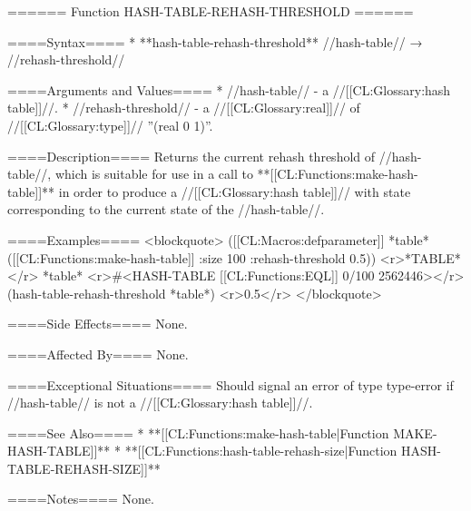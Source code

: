 ====== Function HASH-TABLE-REHASH-THRESHOLD ======

====Syntax====
  * **hash-table-rehash-threshold** //hash-table// → //rehash-threshold//

====Arguments and Values====
  * //hash-table// - a //[[CL:Glossary:hash table]]//.
  * //rehash-threshold// - a //[[CL:Glossary:real]]// of //[[CL:Glossary:type]]// ''(real 0 1)''.

====Description====
Returns the current rehash threshold of //hash-table//, which is suitable for use in a call to **[[CL:Functions:make-hash-table]]** in order to produce a //[[CL:Glossary:hash table]]// with state corresponding to the current state of the //hash-table//.

====Examples====
<blockquote>
([[CL:Macros:defparameter]] *table* ([[CL:Functions:make-hash-table]] :size 100 :rehash-threshold 0.5)) <r>*TABLE*</r>
*table* <r>#<HASH-TABLE [[CL:Functions:EQL]] 0/100 2562446></r>
(hash-table-rehash-threshold *table*) <r>0.5</r>
</blockquote>

====Side Effects====
None.

====Affected By====
None.

====Exceptional Situations====
Should signal an error of type type-error if //hash-table// is not a //[[CL:Glossary:hash table]]//.

====See Also====
  * **[[CL:Functions:make-hash-table|Function MAKE-HASH-TABLE]]**
  * **[[CL:Functions:hash-table-rehash-size|Function HASH-TABLE-REHASH-SIZE]]**

====Notes====
None.

 
